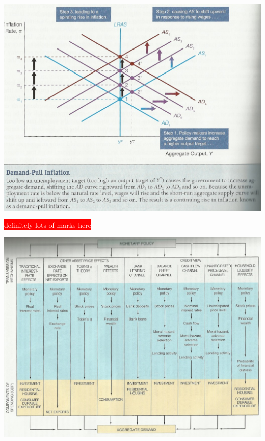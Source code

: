 \documentclass[12pt]{examnotes}
\begin{document}
\begin{center}
    \includegraphics[scale=0.4]{./imgs/c24f10.jpg}
\end{center}
\colorbox{red}{\textcolor{white}{definitely lots of marks here}}


\begin{center}
  \includegraphics[scale=0.5]{./imgs/c26f1.jpg}
\end{center}
\end{document}
